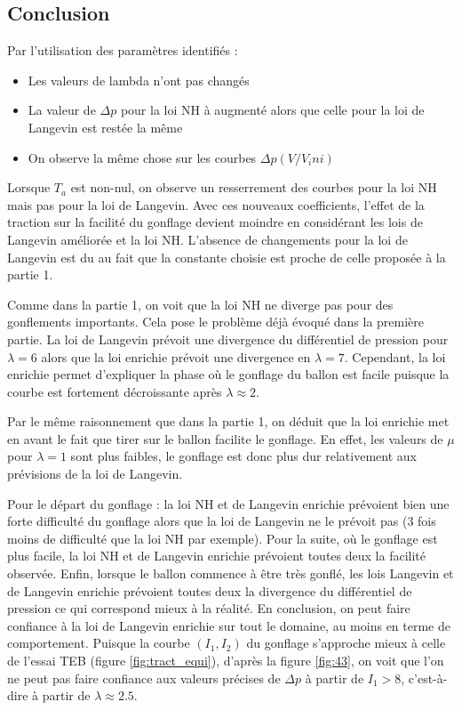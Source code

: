 \documentclass[a4paper,11pt]{article}
\begin{document}
\subsection{Conclusion}
Par l'utilisation des paramètres identifiés :
\begin{itemize}
\item Les valeurs de lambda n'ont pas changés
\item La valeur de $\Delta p$ pour la loi NH à augmenté alors que celle pour la loi de Langevin est restée la même
\item On observe la même chose sur les courbes $\Delta p(V/V_ini)$
\end{itemize}

Lorsque $T_a$ est non-nul, on observe un resserrement des courbes pour la loi NH mais pas pour la loi de Langevin.
Avec ces nouveaux coefficients, l'effet de la traction sur la facilité du gonflage devient moindre en considérant les lois de Langevin améliorée et la loi NH. L'absence de changements pour la loi de Langevin est du au fait que la constante choisie est proche de celle proposée à la partie 1.

Comme dans la partie 1, on voit que la loi NH ne diverge pas pour des gonflements importants. Cela pose le problème déjà évoqué dans la première partie.
La loi de Langevin prévoit une divergence du différentiel de pression pour $\lambda=6$ alors que la loi enrichie prévoit une divergence en $\lambda=7$. Cependant, la loi enrichie permet d'expliquer la phase où le gonflage du ballon est facile puisque la courbe est fortement décroissante après $\lambda \approx 2$.

Par le même raisonnement que dans la partie 1, on déduit que la loi enrichie met en avant le fait que tirer sur le ballon facilite le gonflage. En effet, les valeurs de $\mu$ pour $\lambda = 1$ sont plus faibles, le gonflage est donc plus dur relativement aux prévisions de la loi de Langevin.

Pour le départ du gonflage : la loi NH et de Langevin enrichie prévoient bien une forte difficulté du gonflage alors que la loi de Langevin ne le prévoit pas (3 fois moins de difficulté que la loi NH par exemple).
Pour la suite, où le gonflage est plus facile, la loi NH et de Langevin enrichie prévoient toutes deux la facilité observée.
Enfin, lorsque le ballon commence à être très gonflé, les lois Langevin et de Langevin enrichie prévoient toutes deux la divergence du différentiel de pression ce qui correspond mieux à la réalité.
En conclusion, on peut faire confiance à la loi de Langevin enrichie sur tout le domaine, au moins en terme de comportement. Puisque la courbe $(I_1, I_2)$ du gonflage s'approche mieux à celle de l'essai TEB (figure \ref{fig:tract_equi}), d'après la figure \ref{fig:43}, on voit que l'on ne peut pas faire confiance aux valeurs précises de $\Delta p$ à partir de $I_1 > 8$, c'est-à-dire à partir de $\lambda \approx 2.5$.
\end{document}
